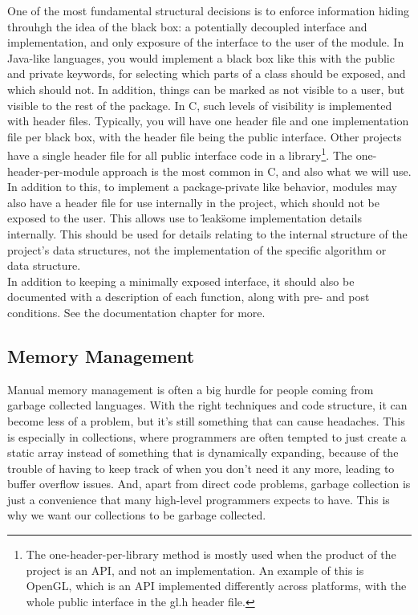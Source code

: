 \documentclass[11pt, letterpaper, twoside, openright]{book}
\begin{document}
    One of the most fundamental structural decisions is to enforce information hiding throuhgh the idea of the black box: a potentially decoupled interface and implementation, and only exposure of the interface to the user of the module. In Java-like languages, you would implement a black box like this with the public and private keywords, for selecting which parts of a class should be exposed, and which should not. In addition, things can be marked as not visible to a user, but visible to the rest of the package. In C, such levels of visibility is implemented with header files. Typically, you will have one header file and one implementation file per black box, with the header file being the public interface. Other projects have a single header file for all public interface code in a library\footnote{The one-header-per-library method is mostly used when the product of the project is an API, and not an implementation. An example of this is OpenGL, which is an API implemented differently across platforms, with the whole public interface in the gl.h header file.}. The one-header-per-module approach is the most common in C, and also what we will use. In addition to this, to implement a package-private like behavior, modules may also have a header file for use internally in the project, which should not be exposed to the user. This allows use to \"leak\" some implementation details internally. This should be used for details relating to the internal structure of the project's data structures, not the implementation of the specific algorithm or data structure.\\

    In addition to keeping a minimally exposed interface, it should also be documented with a description of each function, along with pre- and post conditions. See the documentation chapter for more.\\

  \subsection{Memory Management}
    Manual memory management is often a big hurdle for people coming from garbage collected languages. With the right techniques and code structure, it can become less of a problem, but it's still something that can cause headaches. This is especially in collections, where programmers are often tempted to just create a static array instead of something that is dynamically expanding, because of the trouble of having to keep track of when you don't need it any more, leading to buffer overflow issues. And, apart from direct code problems, garbage collection is just a convenience that many high-level programmers expects to have. This is why we want our collections to be garbage collected.\\
\end{document}
